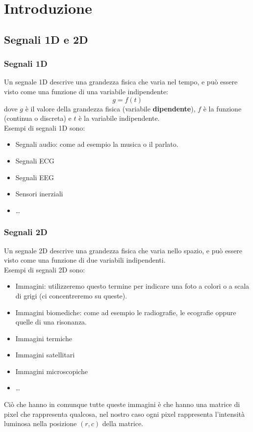 \documentclass[12pt, a4paper]{report}
\begin{document}
\newpage
\tableofcontents
\chapter{Introduzione}
\section{Segnali 1D e 2D}
\subsection{Segnali 1D}
Un segnale 1D descrive una grandezza fisica che varia nel tempo, e può essere visto come una funzione di una variabile indipendente: 
\begin{equation*}
    g = f(t)
\end{equation*}
dove $g$ è il valore della grandezza fisica (variabile \textbf{dipendente}), $f$ è la funzione (continua o discreta) e $t$ è la variabile indipendente.\\
Esempi di segnali 1D sono:
\begin{itemize}
    \item Segnali audio: come ad esempio la musica o il parlato.
    \item Segnali ECG
    \item Segnali EEG
    \item Sensori inerziali
    \item \dots
\end{itemize}
\subsection{Segnali 2D}
Un segnale 2D descrive una grandezza fisica che varia nello spazio, e può essere visto come una funzione di due variabili indipendenti.\\
Esempi di segnali 2D sono:
\begin{itemize}
    \item Immagini: utilizzeremo questo termine per indicare una foto a colori o a scala di grigi (ci concentreremo su queste).
    \item Immagini biomediche: come ad esempio le radiografie, le ecografie oppure quelle di una risonanza.
    \item Immagini termiche
    \item Immagini satellitari
    \item Immagini microscopiche
    \item \dots
\end{itemize}
Ciò che hanno in comunque tutte queste immagini è che hanno una matrice di pixel che rappresenta qualcosa, nel nostro caso ogni pixel rappresenta l'intensità luminosa nella posizione $(r,c)$ della matrice.
\end{document}
